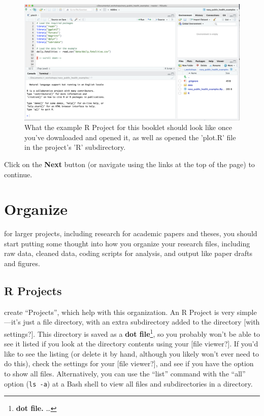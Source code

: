 \documentclass[]{tufte-book}
\begin{document}
\begin{figure}
\includegraphics[width=38.64in]{images/example_repo} \caption[What the example R Project for this booklet should look like once you've downloaded and opened it, as well as opened the 'plot.R' file in the project's 'R' subdirectory]{What the example R Project for this booklet should look like once you've downloaded and opened it, as well as opened the 'plot.R' file in the project's 'R' subdirectory.}\label{fig:examplerepo}
\end{figure}

Click on the \textbf{Next} button (or navigate using the
links at the top of the page) to continue.

\hypertarget{organize}{%
\chapter{Organize}\label{organize}}

 for larger projects, including research
for academic papers and theses, you should start putting some thought into how you
organize your research files, including raw data, cleaned data, coding scripts for
analysis, and output like paper drafts and figures.

\hypertarget{r-projects}{%
\section{R Projects}\label{r-projects}}

 create ``Projects'', which help with this
organization. An R Project is very simple---it's just a file directory, with an
extra subdirectory added to the directory {[}with settings?{]}. This directory is
saved as a \textbf{dot file}\footnote{\textbf{dot file.} \ldots{}}, so you probably won't be able to see it
listed if you look at the directory contents using your {[}file viewer?{]}. If you'd like
to see the listing (or delete it by hand, although you likely won't ever need to
do this), check the settings for your {[}file viewer?{]}, and see if you have the option
to show all files. Alternatively, you can use the ``list'' command with the ``all'' option
(\texttt{ls\ -a}) at a Bash shell to view all files and subdirectories in a directory.
\end{document}
